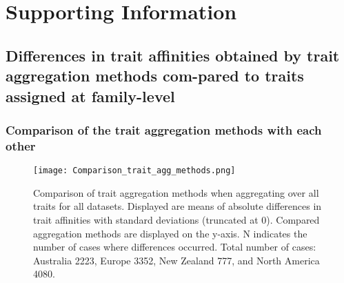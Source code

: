 \documentclass[../Draft_harmonization_paper.tex]{subfiles}
\begin{document}
\section*{Supporting Information}
\label{sec:SI}

\subsection*{Differences in trait affinities obtained by trait aggregation methods com-pared to traits assigned at family-level}

\subsubsection*{Comparison of the trait aggregation methods with each other}
\label{sec:compa_aggr_methods}

\begin{figure}[H]
    \centering
    \texttt{[image: Comparison\_trait\_agg\_methods.png]}
    \caption{Comparison of trait aggregation methods when aggregating over all traits for all datasets. Displayed are means of absolute differences in trait affinities with standard deviations (truncated at 0). Compared aggregation methods are displayed on the y-axis. N indicates the number of cases where differences occurred. Total number of cases: Australia 2223, Europe 3352, New Zealand 777, and North America 4080.}
    \label{fig:comp_aggr_methods}
\end{figure}

 

\end{document}
